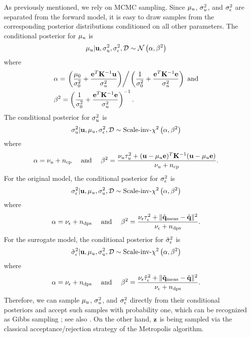 As previously mentioned, we rely on MCMC sampling. Since $\mu_u$, $\sigma_u^2$, and $\sigma_\epsilon^2$ are separated from the forward model, it is easy to draw samples from the corresponding posterior distributions conditioned on all other parameters. The conditional posterior for $\mu_u$ is
\[
  \mu_u | \mathbf{u}, \sigma_u^2, \sigma_\epsilon^2, \mathcal{D} \sim \mathcal{N}\left( \alpha, \beta^2 \right)
\]
where
\begin{align*}
  & \alpha = \left. \left( \frac{\mu_0}{\sigma_0^2} + \frac{\mathbf{e}^T \mathbf{K}^{-1} \mathbf{u}}{\sigma_u^2} \right) \right/ \left( \frac{1}{\sigma_0^2} + \frac{\mathbf{e}^T \mathbf{K}^{-1} \mathbf{e}}{\sigma_u^2} \right) \text{ and} \\
  & \beta^2 = \left( \frac{1}{\sigma_0^2} + \frac{\mathbf{e}^T \mathbf{K}^{-1} \mathbf{e}}{\sigma_u^2} \right)^{-1}.
\end{align*}
The conditional posterior for $\sigma^2_u$ is
\[
  \sigma_u^2 | \mathbf{u}, \mu_u, \sigma_\epsilon^2, \mathcal{D} \sim \text{Scale-inv-}\chi^2\left( \alpha, \beta^2 \right)
\]
where
\[
  \alpha = \nu_u + {n_\text{cp}} \hspace{1em} \text{ and } \hspace{1em} \beta^2 = \frac{\nu_u \tau^2_u + (\mathbf{u} - \mu_u \mathbf{e})^T\mathbf{K}^{-1}(\mathbf{u} - \mu_u \mathbf{e})}{\nu_u + {n_\text{cp}}}.
\]
For the original model, the conditional posterior for $\sigma^2_\epsilon$ is
\[
  \sigma_\epsilon^2 | \mathbf{u}, \mu_u, \sigma_u^2, \mathcal{D} \sim \text{Scale-inv-}\chi^2\left( \alpha, \beta^2 \right)
\]
where
\[
  \alpha = \nu_\epsilon + {n_\text{dps}} \hspace{1em} \text{ and } \hspace{1em} \beta^2 = \frac{\nu_\epsilon \tau^2_\epsilon + \| \tilde{\mathbf{q}}_{\text{meas}} - \tilde{\mathbf{q}} \|^2}{\nu_\epsilon + {n_\text{dps}}}.
\]
For the surrogate model, the conditional posterior for $\tilde{\sigma}^2_\epsilon$ is
\[
  \tilde{\sigma}_\epsilon^2 | \mathbf{u}, \mu_u, \sigma_u^2, \mathcal{D} \sim \text{Scale-inv-}\chi^2\left( \alpha, \beta^2 \right)
\]
where
\[
  \alpha = \nu_\epsilon + {n_\text{dps}} \hspace{1em} \text{ and } \hspace{1em} \beta^2 = \frac{\nu_\epsilon \tilde{\tau}^2_\epsilon + \| \tilde{\mathbf{q}}_{\text{meas}} - \tilde{\mathbf{q}} \|^2}{\nu_\epsilon + {n_\text{dps}}}.
\]
Therefore, we can sample $\mu_u$, $\sigma_u^2$, and $\sigma_\epsilon^2$ directly from their conditional posteriors and accept such samples with probability one, which can be recognized as Gibbs sampling \cite{gelman2004}; see also \cite{marzouk2009}. On the other hand, $\mathbf{z}$ is being sampled via the classical acceptance/rejection strategy of the Metropolis algorithm.
